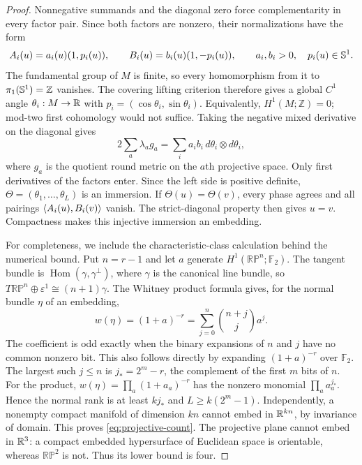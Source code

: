 \begin{proof}
Nonnegative summands and the diagonal zero force complementarity in
every factor pair. Since both factors are nonzero, their normalizations have the
form
\[
 A_i(u)=a_i(u)(1,p_i(u)),\qquad
 B_i(u)=b_i(u)(1,-p_i(u)),\qquad a_i,b_i>0,\quad p_i(u)\in\mathbb S^1.
\]
The fundamental group of $M$ is finite, so every homomorphism from it to
$\pi_1(\mathbb S^1)=\mathbb Z$ vanishes. The covering lifting criterion
therefore gives a global $C^1$ angle $\theta_i:M\to\mathbb R$ with
$p_i=(\cos\theta_i,\sin\theta_i)$. Equivalently,
$H^1(M;\mathbb Z)=0$; mod-two first cohomology would not suffice.
Taking the negative mixed derivative on the diagonal gives
\[
 2\sum_a\lambda_a g_a
       =\sum_i a_i b_i\,d\theta_i\otimes d\theta_i,
\]
where $g_a$ is the quotient round metric on the $a$th projective space.
Only first derivatives of the factors enter. Since the left side is
positive definite, $\Theta=(\theta_1,\ldots,\theta_L)$ is an immersion. If
$\Theta(u)=\Theta(v)$, every phase agrees and all pairings
$\langle A_i(u),B_i(v)\rangle$ vanish. The strict-diagonal property then gives
$u=v$. Compactness makes this injective immersion an embedding.

For completeness, we include the characteristic-class calculation
behind the numerical bound. Put $n=r-1$ and let $a$ generate
$H^1(\mathbb{RP}^n;\mathbb F_2)$. The tangent bundle is
$\operatorname{Hom}(\gamma,\gamma^\perp)$, where $\gamma$ is the
canonical line bundle, so
$T\mathbb{RP}^n\oplus\varepsilon^1\cong(n+1)\gamma$.
The Whitney product formula \citep{MilnorStasheff1974} gives, for the
normal bundle $\eta$ of an embedding,
\[
 w(\eta)=(1+a)^{-r}
   =\sum_{j=0}^n \binom{n+j}{j}a^j.
\]
The coefficient is odd exactly when the binary expansions of $n$ and
$j$ have no common nonzero bit. This also follows directly by expanding
$(1+a)^{-r}$ over $\mathbb F_2$. The largest such $j\leq n$ is
$j_*=2^m-r$, the complement of the first $m$ bits of $n$.
For the product, $w(\eta)=\prod_a(1+a_a)^{-r}$ has the nonzero monomial
$\prod_a a_a^{j_*}$. Hence the normal rank is at least $kj_*$ and
$L\geq k(2^m-1)$. Independently, a nonempty compact manifold of dimension
$kn$ cannot embed in $\mathbb R^{kn}$, by invariance of domain. This proves
\eqref{eq:projective-count}. The projective plane cannot embed in
$\mathbb R^3$: a compact embedded hypersurface of Euclidean space is orientable,
whereas $\mathbb{RP}^2$ is not. Thus its lower bound is four.


\end{proof}
